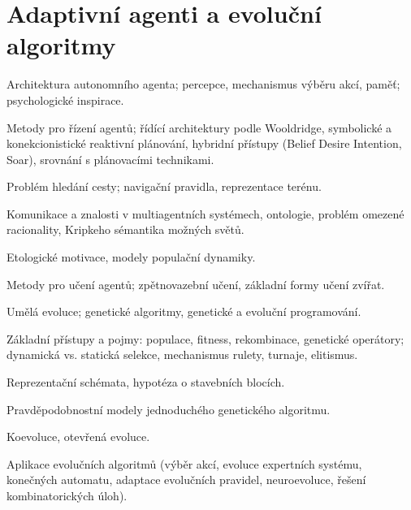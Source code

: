 \newpage
\section{Adaptivní agenti a evoluční algoritmy}
\begin{pozadavky}
\begin{pitemize}
\item Architektura autonomního agenta; percepce, mechanismus výběru akcí, paměť; psychologické inspirace.
\item Metody pro řízení agentů; řídící architektury podle Wooldridge, symbolické a konekcionistické reaktivní plánování, hybridní přístupy (Belief Desire Intention, Soar), srovnání s plánovacími technikami.
\item Problém hledání cesty; navigační pravidla, reprezentace terénu.
\item Komunikace a znalosti v multiagentních systémech, ontologie, problém omezené racionality, Kripkeho sémantika možných světů.
\item Etologické motivace, modely populační dynamiky.
\item Metody pro učení agentů; zpětnovazební učení, základní formy učení zvířat.
\item Umělá evoluce; genetické algoritmy, genetické a evoluční programování. 
\item Základní přístupy a pojmy: populace, fitness, rekombinace, genetické operátory; dynamická vs. statická selekce, mechanismus rulety, turnaje, elitismus.
\item Reprezentační schémata, hypotéza o stavebních blocích.
\item Pravděpodobnostní modely jednoduchého genetického algoritmu.
\item Koevoluce, otevřená evoluce.
\item Aplikace evolučních algoritmů (výběr akcí, evoluce expertních systému, konečných automatu, adaptace evolučních pravidel, neuroevoluce, řešení kombinatorických úloh).
\end{pitemize}
\end{pozadavky}











